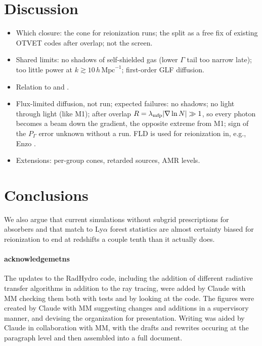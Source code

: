 \documentclass[11pt]{article}
\newcommand{\hmpc}{\,h\,\mathrm{Mpc}^{-1}}
\begin{document}
\section{Discussion}
\begin{itemize}
\item Which closure: the cone for reionization runs; the split as a free
  fix of existing OTVET codes after overlap; not the screen.
\item Shared limits: no shadows of self-shielded gas (lower $\Gamma$ tail
  too narrow late); too little power at $k\gtrsim10\hmpc$; first-order GLF
  diffusion.
\item Relation to \citet{gnedin25} and \citet{wu21}.
\item Flux-limited diffusion, not run; expected failures: no shadows; no
  light through light (like M1); after overlap $R=\lambda_{\rm mfp}|\nabla\ln N|\gg1$,
  so every photon becomes a beam down the gradient, the opposite extreme
  from M1; sign of the $P_\Gamma$ error unknown without a run.
  FLD is used for reionization in, e.g., Enzo \citep{reynolds09,norman15}.
\item Extensions: per-group cones, retarded sources, AMR levels.
\end{itemize}

\section{Conclusions}
 We also argue that current simulations without subgrid prescriptions for absorbers and that match to Ly$\alpha$ forest statistics are almost certainty biased for reionization to end at redshifts a couple tenth than it actually does.


\paragraph{acknowledgemetns} The updates to the RadHydro code, including the addition of different radiative transfer algorithms in addition to the ray tracing, were added by Claude with MM checking them both with tests and by looking at the code.  The figures were created by Claude with MM suggesting changes and additions in a supervisory manner, and devising the organization for presentation.  Writing was aided by Claude in collaboration with MM, with the drafts and rewrites occuring at the paragraph level and then assembled into a full document.
\end{document}

